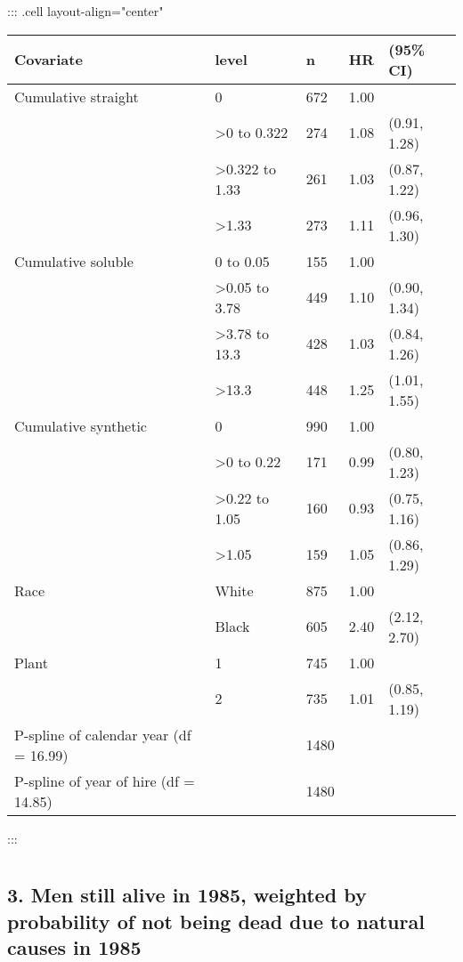 \documentclass[
  11pt,
  letterpaper,
  DIV=11,
  numbers=noendperiod]{scrartcl}
\theoremstyle{remark}\newtheorem*{claim}{Claim}
\begin{document}
\begin{table}[H]
\centering
::: {.cell layout-align="center"}
\begin{tabular}{lllll}
  \toprule
Covariate & level & n & HR & (95\% CI) \\ 
  \midrule
Cumulative straight & 0 & 672 & 1.00 &  \\ 
   & >0 to 0.322 & 274 & 1.08 & (0.91, 1.28) \\ 
   & >0.322 to 1.33 & 261 & 1.03 & (0.87, 1.22) \\ 
   & >1.33 & 273 & 1.11 & (0.96, 1.30) \\ 
  Cumulative soluble & 0 to 0.05 & 155 & 1.00 &  \\ 
   & >0.05 to 3.78 & 449 & 1.10 & (0.90, 1.34) \\ 
   & >3.78 to 13.3 & 428 & 1.03 & (0.84, 1.26) \\ 
   & >13.3 & 448 & 1.25 & (1.01, 1.55) \\ 
  Cumulative synthetic & 0 & 990 & 1.00 &  \\ 
   & >0 to 0.22 & 171 & 0.99 & (0.80, 1.23) \\ 
   & >0.22 to 1.05 & 160 & 0.93 & (0.75, 1.16) \\ 
   & >1.05 & 159 & 1.05 & (0.86, 1.29) \\ 
  Race & White & 875 & 1.00 &  \\ 
   & Black & 605 & 2.40 & (2.12, 2.70) \\ 
  Plant & 1 & 745 & 1.00 &  \\ 
   & 2 & 735 & 1.01 & (0.85, 1.19) \\ 
  P-spline of calendar year (df = 16.99) &  & 1480 &  &  \\ 
  P-spline of year of hire (df = 14.85) &  & 1480 &  &  \\ 
   \bottomrule
\end{tabular}
:::
\end{table}

\hypertarget{section-5}{%
\section{}\label{section-5}}

\hypertarget{men-still-alive-in-1985-weighted-by-probability-of-not-being-dead-due-to-natural-causes-in-1985}{%
\subsection{3. Men still alive in 1985, weighted by probability of not
being dead due to natural causes in
1985}\label{men-still-alive-in-1985-weighted-by-probability-of-not-being-dead-due-to-natural-causes-in-1985}}
\end{document}
